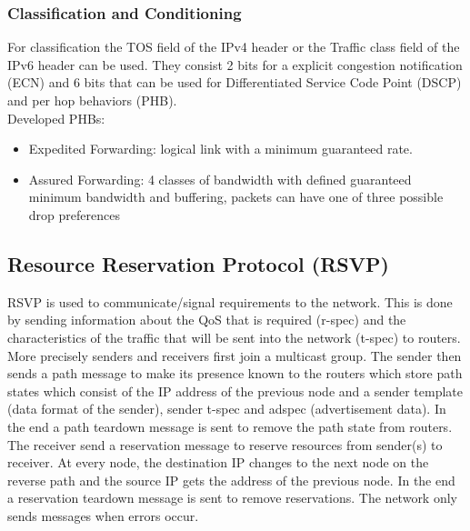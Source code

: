 \subsubsection*{Classification and Conditioning}
For classification the TOS field of the IPv4 header or the Traffic class field of the IPv6 header can be used.
They consist 2 bits for a explicit congestion notification (ECN) and 6 bits that can be used for Differentiated Service Code Point (DSCP) and per hop behaviors (PHB).\\
Developed PHBs:
\begin{itemize}
  \item Expedited Forwarding: logical link with a minimum guaranteed rate.
  \item Assured Forwarding: 4 classes of bandwidth with defined guaranteed minimum bandwidth and buffering, packets can have one of three possible drop preferences
\end{itemize}

\subsection{Resource Reservation Protocol (RSVP)}
RSVP is used to communicate/signal requirements to the network.
This is done by sending information about the QoS that is required (r-spec) and the characteristics of the traffic that will be sent into the network (t-spec) to routers.\\
More precisely senders and receivers first join a multicast group.
The sender then sends a path message to make its presence known to the routers which store path states which consist of the IP address of the previous node and a sender template (data format of the sender), sender t-spec and adspec (advertisement data).
In the end a path teardown message is sent to remove the path state from routers.\\
The receiver send a reservation message to reserve resources from sender(s) to receiver.
At every node, the destination IP changes to the next node on the reverse path and the source IP gets the address of the previous node.
In the end a reservation teardown message is sent to remove reservations.
The network only sends messages when errors occur.

